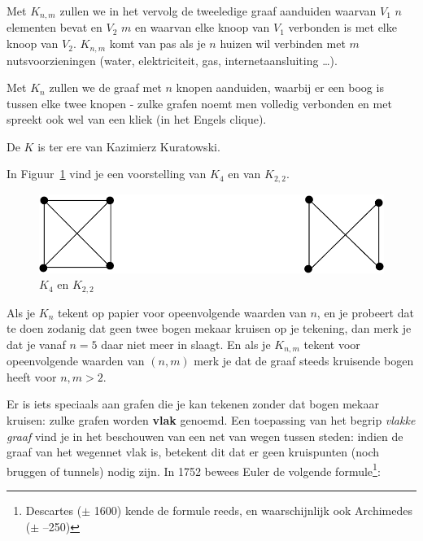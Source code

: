 

Met $K_{n,m}$ zullen we in het vervolg de tweeledige graaf aanduiden
waarvan $V_{1}$ $n$ elementen bevat en $V_{2}$ $m$ en waarvan elke knoop
van $V_{1}$ verbonden is met elke knoop van $V_{2}$. $K_{n,m}$ komt
van pas als je $n$ huizen wil verbinden met $m$ nutsvoorzieningen (water,
elektriciteit, gas, internetaansluiting \ldots).

Met $K_{n}$ zullen we de graaf met $n$ knopen aanduiden, waarbij er
een boog is tussen elke twee knopen - zulke grafen noemt men
\textup{volledig verbonden} en met spreekt ook wel van een kliek (in
het Engels clique).

De $K$ is ter ere van Kazimierz Kuratowski.

In Figuur~\ref{kuratowski1} vind je een voorstelling van $K_{4}$ en
van $K_{2,2}$.

\begin{figure}[ht]
\begin{center}
\includegraphics[width=0.4\linewidth,keepaspectratio]{kuratowski1}
\end{center}
\caption{$K_{4}$ en $K_{2,2}$ \label{kuratowski1}}
\end{figure}

Als je $K_{n}$ tekent op papier voor opeenvolgende waarden van $n$, en
je probeert dat te doen zodanig dat geen twee bogen mekaar kruisen op
je tekening, dan merk je dat je vanaf $n=5$ daar niet meer in
slaagt. En als je $K_{n,m}$ tekent voor opeenvolgende waarden van
$(n,m)$ merk je dat de graaf steeds kruisende bogen heeft voor 
$n,m > 2$.

Er is iets speciaals aan grafen die je kan tekenen zonder dat bogen
mekaar kruisen: zulke grafen worden \textbf{vlak} genoemd. Een
toepassing van het begrip {\em vlakke graaf} vind je in het beschouwen
van een net van wegen tussen steden: indien de graaf van het wegennet
vlak is, betekent dit dat er geen kruispunten (noch bruggen of
tunnels) nodig zijn. In 1752 bewees Euler de volgende 
formule\footnote{Descartes ($\pm$ 1600) kende de formule reeds, 
en waarschijnlijk ook Archimedes ($\pm$ --250)}:

